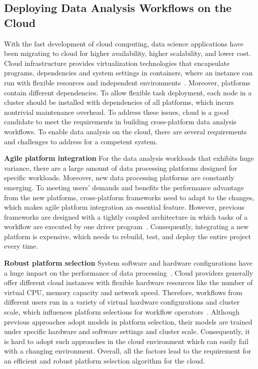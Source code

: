 \subsection{Deploying Data Analysis Workflows on the Cloud}

With the fast development of cloud computing, data science applications have been migrating to cloud for higher availability, higher scalability, and lower cost.
Cloud infrastructure provides virtualization technologies that encapsulate programs, dependencies and system settings in containers, where an instance can run with flexible resources and independent environments~\cite{wang2017myria}. Moreover, platforms contain different dependencies. To allow flexible task deployment, each node in a cluster should be installed with dependencies of all platforms, which incurs nontrivial maintenance overhead. 
To address these issues, cloud is a good candidate to meet the requirements in building cross-platform data analysis workflows.
To enable data analysis on the cloud, there are several requirements and challenges to address for a competent system.

\textbf{Agile platform integration} For the data analysis workloads that exhibits huge variance, there are a large amount of data processing platforms designed for specific workloads. Moreover, new data processing platforms are constantly emerging. To meeting users' demands and benefits the performance advantage from the new platforms, cross-platform  frameworks need to adapt to the changes, which makes agile platform integration an essential feature. However, previous frameworks are designed with a tightly coupled architecture in which tasks of a workflow are executed by one driver program~\cite{balalaie2015migrating}. Consequently, integrating a new platform is expensive, which needs to rebuild, test, and deploy the entire project every time.


\textbf{Robust platform selection} System software and hardware configurations have a huge impact on the performance of data processing~\cite{mattson2019mlperf}. Cloud providers generally offer different cloud instances with flexible hardware resources like the number of virtual CPU, memory capacity and network speed. Therefore, workflows from different users run in a variety of virtual hardware configurations and cluster scale, which influences platform selections for workflow operators~\cite{}. Although previous approaches adopt models in platform selection, their models are trained under specific hardware and software settings and cluster scale. Consequently, it is hard to adopt such approaches in the cloud environment which can easily fail with a changing environment. Overall, all the factors lead to the requirement for an efficient and robust platform selection algorithm for the cloud.


